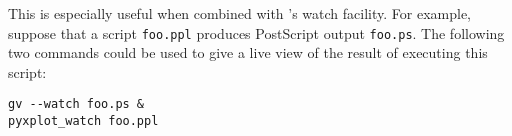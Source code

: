 This is especially useful when combined with \ghostview's
watch facility. For example, suppose that a script {\tt foo.ppl} produces
PostScript output {\tt foo.ps}. The following two commands could be used to
give a live view of the result of executing this script:

\begin{verbatim}
gv --watch foo.ps &
pyxplot_watch foo.ppl
\end{verbatim}

